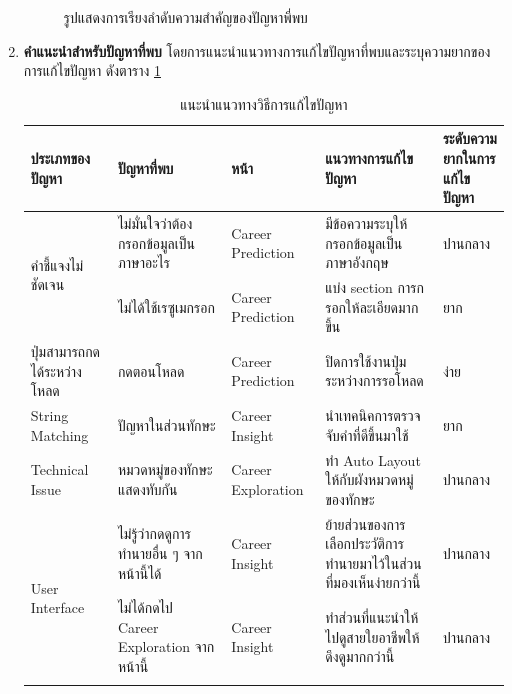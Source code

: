 \begin{enumerate}
\begin{figure}[H]
              \caption{รูปแสดงการเรียงลำดับความสำคัญของปัญหาพี่พบ}\label{fig:PrioritizeUT}
          \end{figure}
    \item \textbf{คำแนะนำสำหรับปัญหาที่พบ} โดยการแนะนำแนวทางการแก้ไขปัญหาที่พบและระบุความยากของการแก้ไขปัญหา ดังตาราง \ref{tab:recommendationsUT}
          \begin{table}[H]
              \caption{แนะนำแนวทางวิธีการแก้ไขปัญหา}
              \label{tab:recommendationsUT}
              \begin{tabularx}{\textwidth}{|l|>{\raggedright\arraybackslash}X|l|>{\raggedright\arraybackslash}X|>{\raggedright\arraybackslash}X|}
                  \hline
                  \textbf{ประเภทของปัญหา}             & \textbf{ปัญหาที่พบ}                    & \textbf{หน้า}       & \textbf{แนวทางการแก้ไขปัญหา}                          & \textbf{ระดับความยากในการแก้ไขปัญหา} \\ \hline
                  \multirow[t]{2}{*}{คำชี้แจงไม่ชัดเจน}   & ไม่มั่นใจว่าต้องกรอกข้อมูลเป็นภาษาอะไร      & Career Prediction  & มีข้อความระบุให้กรอกข้อมูลเป็นภาษาอังกฤษ                    & ปานกลาง                           \\ \cline{2-5}
                                                     & ไม่ได้ใช้เรซูเมกรอก                     & Career Prediction  & แบ่ง section การกรอกให้ละเอียดมากขึ้น                    & ยาก                               \\ \hline
                  ปุ่มสามารถกดได้ระหว่างโหลด             & กดตอนโหลด                           & Career Prediction  & ปิดการใช้งานปุ่มระหว่างการรอโหลด                         & ง่าย                               \\ \hline
                  String Matching                    & ปัญหาในส่วนทักษะ                       & Career Insight     & นำเทคนิคการตรวจจับคำที่ดีขึ้นมาใช้                            & ยาก                               \\ \hline
                  Technical Issue                    & หมวดหมู่ของทักษะแสดงทับกัน               & Career Exploration & ทำ Auto Layout ให้กับผังหมวดหมู่ของทักษะ                   & ปานกลาง                           \\ \hline
                  \multirow[t]{3}{*}{User Interface} & ไม่รู้ว่ากดดูการทำนายอื่น ๆ จากหน้านี้ได้       & Career Insight     & ย้ายส่วนของการเลือกประวัติการทำนายมาไว้ในส่วนที่มองเห็นง่ายกว่านี้ & ปานกลาง                           \\ \cline{2-5}
                                                     & ไม่ได้กดไป Career Exploration จากหน้านี้ & Career Insight     & ทำส่วนที่แนะนำให้ไปดูสายใยอาชีพให้ดึงดูมากกว่านี้                 & ปานกลาง                           \\ \cline{2-5}

\end{tabularx}
\end{table}
\end{enumerate}
